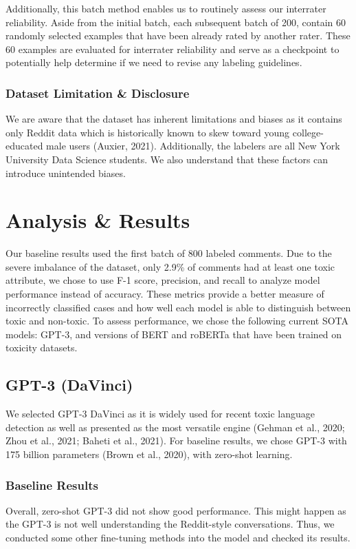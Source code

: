 \documentclass[11pt]{article}
\begin{document}
Additionally, this batch method enables us to routinely assess our interrater reliability. Aside from the initial batch, each subsequent batch of 200, contain 60 randomly selected examples that have been already rated by another rater. These 60 examples are evaluated for interrater reliability and serve as a checkpoint to potentially help determine if we need to revise any labeling guidelines.

\subsubsection{Dataset Limitation & Disclosure}

We are aware that the dataset has inherent limitations and biases as it contains only Reddit data which is historically known to skew toward young college-educated male users (Auxier, 2021). Additionally, the labelers are all New York University Data Science students. We also understand that these factors can introduce unintended biases.


\section{Analysis & Results}
Our baseline results used the first batch of 800 labeled comments. Due to the severe imbalance of the dataset, only 2.9\% of comments had at least one toxic attribute, we chose to use F-1 score, precision, and recall to analyze model performance instead of accuracy. These metrics provide a better measure of incorrectly classified cases and how well each model is able to distinguish between toxic and non-toxic. To assess performance, we chose the following current SOTA models: GPT-3, and versions of BERT and roBERTa that have been trained on toxicity datasets.
\subsection{GPT-3 (DaVinci)}
We selected GPT-3 DaVinci as it is widely used for recent toxic language detection as well as presented as the most versatile engine (Gehman et al., 2020; Zhou et al., 2021; Baheti et al., 2021).  For baseline results, we chose GPT-3 with 175 billion parameters (Brown et al., 2020), with zero-shot learning.
\subsubsection{Baseline Results}
Overall, zero-shot GPT-3 did not show good performance. This might happen as the GPT-3 is not well understanding the Reddit-style conversations. Thus, we conducted some other fine-tuning methods into the model and checked its results. 
\end{document}

